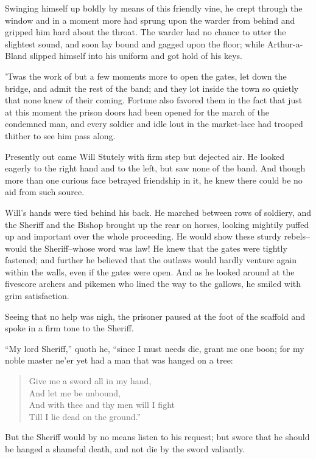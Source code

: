 Swinging himself up boldly by means of this friendly vine, he crept
through the window and in a moment more had sprung upon the warder from
behind and gripped him hard about the throat. The warder had no chance
to utter the slightest sound, and soon lay bound and gagged upon the
floor; while Arthur-a-Bland slipped himself into his uniform and got
hold of his keys.

'Twas the work of but a few moments more to open the gates, let down the
bridge, and admit the rest of the band; and they lot inside the town so
quietly that none knew of their coming. Fortune also favored them in the
fact that just at this moment the prison doors had been opened for the
march of the condemned man, and every soldier and idle lout in the
market-lace had trooped thither to see him pass along.

Presently out came Will Stutely with firm step but dejected air. He
looked eagerly to the right hand and to the left, but saw none of the
band. And though more than one curious face betrayed friendship in it,
he knew there could be no aid from such source.

Will's hands were tied behind his back. He marched between rows of
soldiery, and the Sheriff and the Bishop brought up the rear on horses,
looking mightily puffed up and important over the whole proceeding. He
would show these sturdy rebels--would the Sheriff--whose word was law!
He knew that the gates were tightly fastened; and further he believed
that the outlaws would hardly venture again within the walls, even if
the gates were open. And as he looked around at the fivescore archers
and pikemen who lined the way to the gallows, he smiled with grim
satisfaction.

Seeing that no help was nigh, the prisoner paused at the foot of the
scaffold and spoke in a firm tone to the Sheriff.

``My lord Sheriff,'' quoth he, ``since I must needs die, grant me one
boon; for my noble master ne'er yet had a man that was hanged on a tree:

\begin{quote}
Give me a sword all in my hand,\\
And let me be unbound,\\
And with thee and thy men will I fight\\
Till I lie dead on the ground.''
\end{quote}

But the Sheriff would by no means listen to his request; but swore that
he should be hanged a shameful death, and not die by the sword
valiantly.

